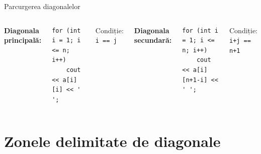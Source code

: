 \documentclass{beamer}
\begin{document}
\begin{frame}[fragile]{Parcurgerea diagonalelor}
  \begin{columns}[T]
    \textbf{Diagonala principală:}
    \begin{lstlisting}
for (int i = 1; i <= n; i++)
    cout << a[i][i] << ' ';
    \end{lstlisting}
    Condiție: \texttt{i == j}

    \textbf{Diagonala secundară:}
    \begin{lstlisting}
for (int i = 1; i <= n; i++)
    cout << a[i][n+1-i] << ' ';
    \end{lstlisting}
    Condiție: \texttt{i+j == n+1}
  \end{columns}

\end{frame}

\section{Zonele delimitate de diagonale}
\end{document}
